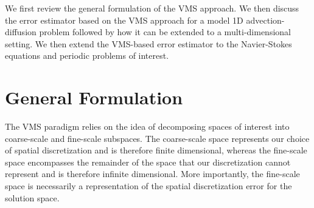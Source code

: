 We first review the general formulation of the VMS approach.
We then discuss the error estimator based on the VMS approach for a model 1D advection-diffusion problem followed by how it can be extended to a multi-dimensional setting.
We then extend the VMS-based error estimator to the Navier-Stokes equations and periodic problems of interest.

\section{General Formulation}
\label{sec:VMS_form}


The VMS paradigm relies on the idea of decomposing spaces of interest into coarse-scale and fine-scale subspaces.
The coarse-scale space represents our choice of spatial discretization and is therefore finite dimensional, whereas the fine-scale space encompasses the remainder of the space that our discretization cannot represent and is therefore infinite dimensional.
More importantly, the fine-scale space is necessarily a representation of the spatial discretization error for the solution space.

